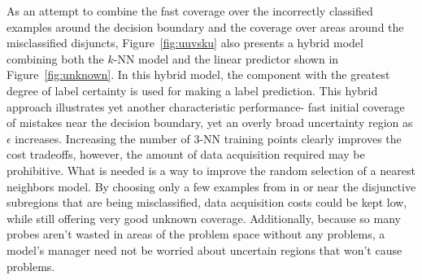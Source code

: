 As an attempt to combine the fast coverage over the incorrectly classified examples around the decision boundary and the coverage over areas around the misclassified disjuncts, Figure~\ref{fig:uuvsku} also presents a hybrid model combining both the $k$-NN model and the linear predictor shown in Figure~\ref{fig:unknown}.  In this hybrid model, the component with the greatest degree of label certainty is used for making a label prediction. This hybrid approach illustrates yet another characteristic performance- fast initial coverage of mistakes near the decision boundary, yet an overly broad uncertainty region as $\epsilon$ increases. Increasing the number of $3$-NN training points clearly improves the cost tradeoffs, however, the amount of data acquisition required may be prohibitive. What is needed is a way to improve the random selection of a nearest neighbors model. By choosing only a few examples from in or near the disjunctive subregions that are being misclassified, data acquisition costs could be kept low, while still offering very good unknown coverage. Additionally, because so many probes aren't wasted in areas of the problem space without any problems, a model's manager need not be worried about uncertain regions that won't cause problems. 

